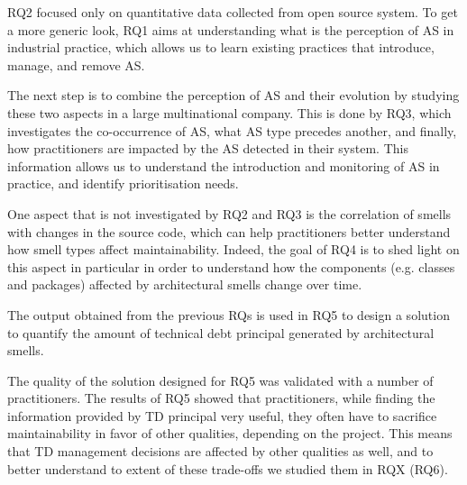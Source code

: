 RQ2 focused only on quantitative data collected from open source system. To get a more generic look, RQ1 aims at understanding what is the perception of AS in industrial practice, which allows us to learn existing practices that introduce, manage, and remove AS.

The next step is to combine the perception of AS and their evolution by studying these two aspects in a large multinational company.
This is done by RQ3, which investigates the co-occurrence of AS, what AS type precedes another, and finally, how practitioners are impacted by the AS detected in their system.
This information allows us to understand the introduction and monitoring of AS in practice, and identify prioritisation needs.
 
One aspect that is not investigated by RQ2 and RQ3 is the correlation of smells with changes in the source code, which can help practitioners better understand how smell types affect maintainability. Indeed, the goal of RQ4 is to shed light on this aspect in particular in order to understand how the components (e.g. classes and packages) affected by architectural smells change over time.

The output obtained from the previous RQs is used in RQ5 to design a solution to quantify the amount of technical debt principal generated by architectural smells.

The quality of the solution designed for RQ5 was validated with a number of practitioners.
The results of RQ5 showed that practitioners, while finding the information provided by TD principal very useful, they often have to sacrifice maintainability in favor of other qualities, depending on the project.
This means that TD management decisions are affected by other qualities as well, and to better understand to extent of these trade-offs we studied them in RQX (RQ6).
 
    
    
